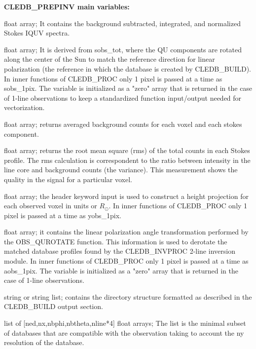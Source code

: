\documentclass{article}
\begin{document}
\textbf{CLEDB\_PREPINV main variables:}
\begin{description}
    [font=\normalfont,leftmargin=1.3in,style=multiline]
    \item[sobs\_tot]
        [xs,ys,nline*4] float array; It contains the background subtracted, integrated, and normalized Stokes IQUV spectra. 
    \item[sobs\_totrot]
        [xs,ys,nline*4] float array; It is derived from sobs\_tot, where the QU components are rotated along the center of the Sun to match the reference direction for linear polarization (the reference in which the database is created by CLEDB\_BUILD). In inner functions of CLEDB\_PROC only 1 pixel is passed at a time as sobs\_1pix. The variable is initialized as a "zero" array that is returned in the case of 1-line observations to keep a standardized function input/output needed for vectorization.        
    \item[background]
    	   [xs,ys,nline*4] float array; returns averaged background counts for each voxel and each stokes component. 
    \item[rms]
       [xs,ys,nline*4] float array; returns the root mean square (rms) of the total counts in each Stokes profile. The rms calculation is correspondent to the ratio between intensity in the line core and background counts (the variance). This measurement shows the quality in the signal for a particular voxel.         
    \item[yobs]
       [xs,ys] float array; the header keyword input is used to construct a height projection for each observed voxel in units or $R_\odot$. In inner functions of CLEDB\_PROC only 1 pixel is passed at a time as yobs\_1pix.
    \item[aobs]
       [xs,ys] float array; it contains the linear polarization angle transformation performed by the OBS\_QUROTATE function. This information is used to derotate the matched database profiles found by the CLEDB\_INVPROC 2-line inversion module. In inner functions of CLEDB\_PROC only 1 pixel is passed at a time as aobs\_1pix. The variable is initialized as a "zero" array that is returned in the case of 1-line observations.
    \item[dbsubdirs]
       string or string list; contains the directory structure formatted as described in the CLEDB\_BUILD output section.
     \item[database]
        list of [ned,nx,nbphi,nbtheta,nline*4] float arrays; The list is the minimal subset of databases that are compatible with the observation taking to account the ny resolution of the database.        

\end{description}
\end{document}
